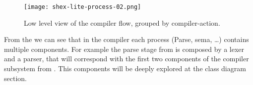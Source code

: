 \begin{figure*}[hb]
    \texttt{[image: shex-lite-process-02.png]}
    \caption[Low level view of the compiler flow, grouped by compiler-action]{Low level view of the compiler flow, grouped by compiler-action.}
\end{figure*}

From the  we can see that in the compiler each process (Parse, sema, …)
contains multiple components. For example the parse stage from  is composed
by a lexer and a parser, that will correspond with the first two components of the compiler
subsystem from . This components will be deeply explored at the class diagram
section. 